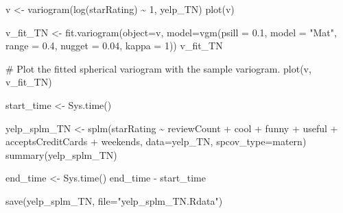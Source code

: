 \documentclass[
  12pt,
  letterpaper,
  DIV=11,
  numbers=noendperiod]{scrartcl}
\newenvironment{Shaded}{\begin{snugshade}}{\end{snugshade}}
\newcommand{\AttributeTok}[1]{\textcolor[rgb]{0.98,0.46,0.51}{#1}}
\newcommand{\CommentTok}[1]{\textcolor[rgb]{0.42,0.45,0.49}{#1}}
\newcommand{\DecValTok}[1]{\textcolor[rgb]{0.47,0.72,1.00}{#1}}
\newcommand{\FloatTok}[1]{\textcolor[rgb]{0.47,0.72,1.00}{#1}}
\newcommand{\FunctionTok}[1]{\textcolor[rgb]{0.70,0.57,0.94}{#1}}
\newcommand{\NormalTok}[1]{\textcolor[rgb]{0.88,0.89,0.91}{#1}}
\newcommand{\OtherTok}[1]{\textcolor[rgb]{0.70,0.57,0.94}{#1}}
\newcommand{\SpecialCharTok}[1]{\textcolor[rgb]{0.47,0.72,1.00}{#1}}
\newcommand{\StringTok}[1]{\textcolor[rgb]{0.62,0.80,1.00}{#1}}
\begin{document}
\begin{Shaded}
\begin{Highlighting}[]
\NormalTok{v }\OtherTok{\textless{}{-}} \FunctionTok{variogram}\NormalTok{(}\FunctionTok{log}\NormalTok{(starRating) }\SpecialCharTok{\textasciitilde{}} \DecValTok{1}\NormalTok{, yelp\_TN)}
\FunctionTok{plot}\NormalTok{(v)}
\end{Highlighting}
\end{Shaded}

\begin{Shaded}
\begin{Highlighting}[]
\NormalTok{v\_fit\_TN }\OtherTok{\textless{}{-}} \FunctionTok{fit.variogram}\NormalTok{(}\AttributeTok{object=}\NormalTok{v, }
                           \AttributeTok{model=}\FunctionTok{vgm}\NormalTok{(}\AttributeTok{psill =} \FloatTok{0.1}\NormalTok{, }\AttributeTok{model =} \StringTok{"Mat"}\NormalTok{, }
                                     \AttributeTok{range =} \FloatTok{0.4}\NormalTok{, }\AttributeTok{nugget =} \FloatTok{0.04}\NormalTok{, }\AttributeTok{kappa =} \DecValTok{1}\NormalTok{))}
\NormalTok{v\_fit\_TN}

\CommentTok{\# Plot the fitted spherical variogram with the sample variogram.}
\FunctionTok{plot}\NormalTok{(v, v\_fit\_TN)}
\end{Highlighting}
\end{Shaded}

\begin{Shaded}
\begin{Highlighting}[]
\NormalTok{start\_time }\OtherTok{\textless{}{-}} \FunctionTok{Sys.time}\NormalTok{()}


\NormalTok{yelp\_splm\_TN }\OtherTok{\textless{}{-}} \FunctionTok{splm}\NormalTok{(starRating }\SpecialCharTok{\textasciitilde{}}\NormalTok{ reviewCount }\SpecialCharTok{+}\NormalTok{ cool }\SpecialCharTok{+}\NormalTok{ funny }\SpecialCharTok{+}\NormalTok{ useful }\SpecialCharTok{+}\NormalTok{ acceptsCreditCards }\SpecialCharTok{+}\NormalTok{ weekends, }\AttributeTok{data=}\NormalTok{yelp\_TN, }\AttributeTok{spcov\_type=}\StringTok{\textquotesingle{}matern\textquotesingle{}}\NormalTok{)}
\FunctionTok{summary}\NormalTok{(yelp\_splm\_TN)}

\NormalTok{end\_time }\OtherTok{\textless{}{-}} \FunctionTok{Sys.time}\NormalTok{()}
\NormalTok{end\_time }\SpecialCharTok{{-}}\NormalTok{ start\_time}
\end{Highlighting}
\end{Shaded}

\begin{Shaded}
\begin{Highlighting}[]
\FunctionTok{save}\NormalTok{(yelp\_splm\_TN, }\AttributeTok{file=}\StringTok{"yelp\_splm\_TN.Rdata"}\NormalTok{)}
\end{Highlighting}
\end{Shaded}
\end{document}
